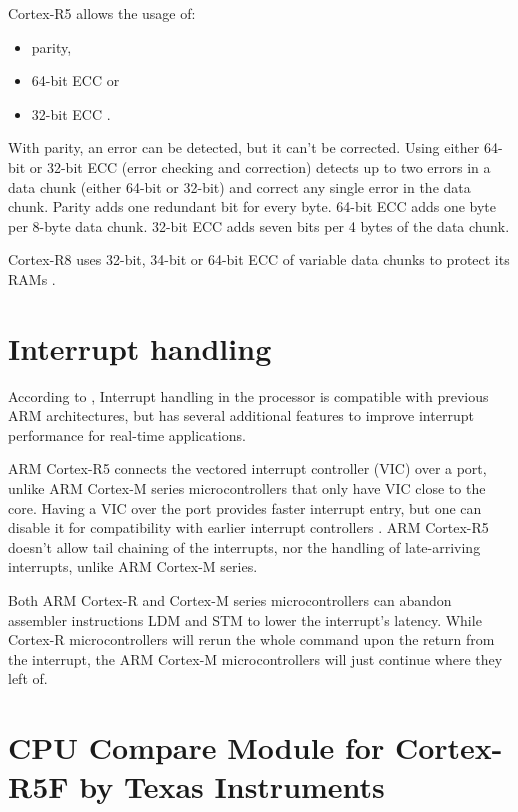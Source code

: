 Cortex-R5 allows the usage of:
\begin{itemize}

    \item parity,
    \item 64-bit ECC or
    \item 32-bit ECC \citep{cortex_r5_reference_manual}.
\end{itemize}

With parity, an error can be detected, but it can't be corrected. Using either 64-bit or 32-bit ECC (error checking and correction) detects up to two errors in a data chunk (either 64-bit or 32-bit) and correct any single error in the data chunk. Parity adds one redundant bit for every byte. 64-bit ECC adds one byte per 8-byte data chunk. 32-bit ECC adds seven bits per 4 bytes of the data chunk. 

Cortex-R8 uses 32-bit, 34-bit or 64-bit ECC of variable data chunks to protect its RAMs \citep{cortex_r8_reference_manual}.

\section{Interrupt handling}

According to \citep{cortex_r5_reference_manual}, Interrupt handling in the processor is compatible with previous ARM architectures, but has
several additional features to improve interrupt performance for real-time applications.

ARM Cortex-R5 connects the vectored interrupt controller (VIC) over a port, unlike ARM Cortex-M series microcontrollers that only have VIC close to the core. Having a VIC over the port provides faster interrupt entry, but one can disable it for compatibility with earlier interrupt controllers \citep{cortex_r5_reference_manual}. ARM Cortex-R5 doesn't allow tail chaining of the interrupts, nor the handling of late-arriving interrupts, unlike ARM Cortex-M series. 

Both ARM Cortex-R and Cortex-M series microcontrollers can abandon assembler instructions LDM and STM to lower the interrupt's latency. While Cortex-R microcontrollers will rerun the whole command upon the return from the interrupt, the ARM Cortex-M microcontrollers will just continue where they left of.

 

\section{CPU Compare Module for Cortex-R5F by Texas Instruments}

